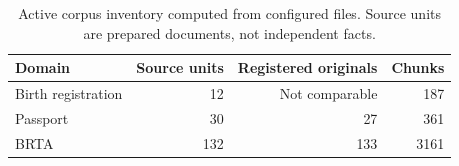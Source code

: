 \begin{table}[htbp]\centering\small
\caption{Active corpus inventory computed from configured files. Source units are prepared documents, not independent facts.}
\begin{tabularx}{\linewidth}{Xrrr}\toprule
Domain & Source units & Registered originals & Chunks\\\midrule
Birth registration & 12 & Not comparable & 187\\
Passport & 30 & 27 & 361\\
BRTA & 132 & 133 & 3161\\
\bottomrule\end{tabularx}\end{table}
